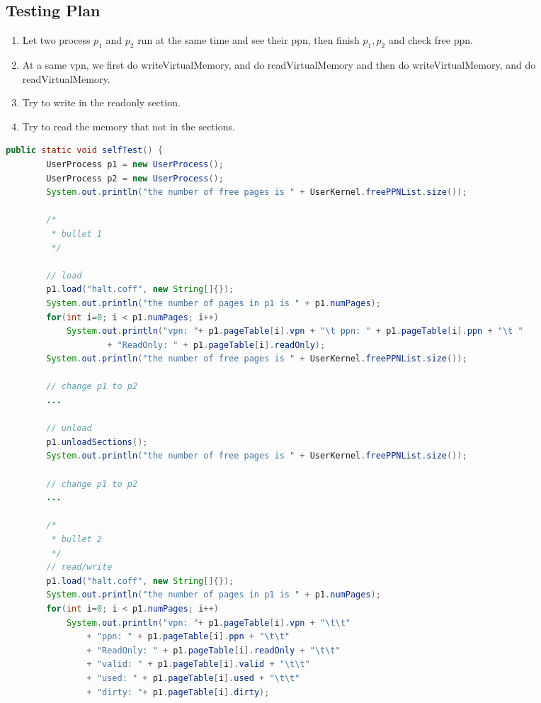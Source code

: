 \documentclass{article}
\begin{document}
\begin{spacing}{1.1}
\subsection{Testing Plan}
\begin{enumerate}[$\bullet$]
  \item Let two process $p_1$ and $p_2$ run at the same time and see
    their ppn, then finish $p_1,p_2$ and check free ppn.
  \item At a same vpn, we first do \textsf{writeVirtualMemory},
    and do \textsf{readVirtualMemory} and then do \textsf{writeVirtualMemory},
    and do \textsf{readVirtualMemory}.
  \item Try to write in the readonly section.
  \item Try to read the memory that not in the sections.
\end{enumerate}

\begin{lstlisting}[language=Java]
public static void selfTest() {
    	UserProcess p1 = new UserProcess();
    	UserProcess p2 = new UserProcess();
    	System.out.println("the number of free pages is " + UserKernel.freePPNList.size());

    	/*
    	 * bullet 1
    	 */
    	
    	// load
    	p1.load("halt.coff", new String[]{});
    	System.out.println("the number of pages in p1 is " + p1.numPages);
    	for(int i=0; i < p1.numPages; i++)
    		System.out.println("vpn: "+ p1.pageTable[i].vpn + "\t ppn: " + p1.pageTable[i].ppn + "\t "
    				+ "ReadOnly: " + p1.pageTable[i].readOnly);
    	System.out.println("the number of free pages is " + UserKernel.freePPNList.size());
    	
    	// change p1 to p2
    	...

    	// unload
    	p1.unloadSections();
    	System.out.println("the number of free pages is " + UserKernel.freePPNList.size());
    	
    	// change p1 to p2
    	...

    	/*
    	 * bullet 2
    	 */
    	// read/write
    	p1.load("halt.coff", new String[]{});
    	System.out.println("the number of pages in p1 is " + p1.numPages);
    	for(int i=0; i < p1.numPages; i++)
    		System.out.println("vpn: "+ p1.pageTable[i].vpn + "\t\t"
    			+ "ppn: " + p1.pageTable[i].ppn + "\t\t"
    			+ "ReadOnly: " + p1.pageTable[i].readOnly + "\t\t"
    			+ "valid: " + p1.pageTable[i].valid + "\t\t"
    			+ "used: " + p1.pageTable[i].used + "\t\t"
    			+ "dirty: "+ p1.pageTable[i].dirty);
    	

\end{lstlisting}
\end{spacing}
\end{document}
